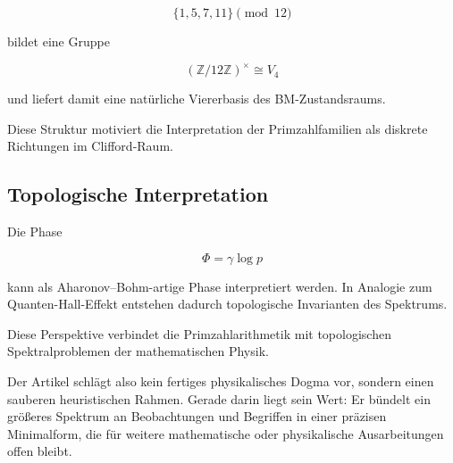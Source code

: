 \documentclass[11pt,a4paper]{article}
\theoremstyle{definition}
\theoremstyle{plain}
\begin{document}
	\[
	\{1,5,7,11\}\pmod{12}
	\]
	
	bildet eine Gruppe
	
	\[
	(\mathbb{Z}/12\mathbb{Z})^\times
	\cong V_4
	\]
	
	und liefert damit eine natürliche Viererbasis des
	BM-Zustandsraums.
	
	Diese Struktur motiviert die Interpretation der
	Primzahlfamilien als diskrete Richtungen im Clifford-Raum.
	
	\subsection{Topologische Interpretation}
	
	Die Phase
	
	\[
	\Phi = \gamma \log p
	\]
	
	kann als Aharonov--Bohm-artige Phase interpretiert werden.
	In Analogie zum Quanten-Hall-Effekt entstehen dadurch
	topologische Invarianten des Spektrums.
	
	Diese Perspektive verbindet die Primzahlarithmetik mit
	topologischen Spektralproblemen der mathematischen Physik.
	
	Der Artikel schlägt also kein fertiges physikalisches Dogma vor, sondern einen sauberen heuristischen Rahmen. Gerade darin liegt sein Wert: Er bündelt ein größeres Spektrum an Beobachtungen und Begriffen in einer präzisen Minimalform, die für weitere mathematische oder physikalische Ausarbeitungen offen bleibt.
	
\end{document}
